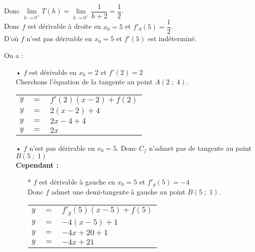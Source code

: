 \begin{itemize}
\vspace*{.3cm}

Donc $\lim\limits_{h \to 0^+} T(h) = \lim\limits_{h \to 0^+} \dfrac{1}{h + 2} = \dfrac{1}{2}$. \\

Donc $f$ est dérivable à droite en $x_0 = 5$ et $f'_{d}\left(5\right) = \dfrac{1}{2}$. \\

D'où $f$ n'est pas dérivable en $x_0 = 5$ et $f'(5)$ est indéterminé.
\end{itemize}

\newpage

On a : \\

\begin{itemize}
\item[•] $f$ est dérivable en $x_0 = 2$ et $f'(2) = 2$ \\

Cherchons l'équation de la tangente au point $A(2 \; ; \; 4)$. \\

\begin{tabular}{lll}
$y$ & $=$ & $f'(2) (x-2) + f(2)$ \\
$y$ & $=$ & $2\left(x-2\right) + 4$ \\
$y$ & $=$ & $2x - 4 + 4$ \\
$y$ & $=$ & $2x$ \\
\end{tabular}

\vspace*{.3cm}

\item[•] $f$ n'est pas dérivable en $x_0 = 5$. Donc $C_f$ n'admet pas de tangente au point $B(5 \; ; \; 1)$\\

\textbf{Cependant :} \\

\begin{itemize}
\item[*] $f$ est dérivable à gauche en $x_0 = 5$ et $f'_g(5) = -4$ \\ Donc $f$ admet une demi-tangente à gauche au point $B(5 \; ; \; 1)$. \\

\begin{tabular}{lll}
$y$ & $=$ & $f'_g(5)(x-5)+f(5)$ \vspace*{.3cm} \\
$y$ & $=$ & $-4(x-5) + 1$ \vspace*{.3cm} \\
$y$ & $=$ & $-4x + 20 + 1$ \vspace*{.3cm} \\
$y$ & $=$ & $-4x + 21$ \vspace*{.3cm} \\
\end{tabular}


\end{itemize}
\end{itemize}

